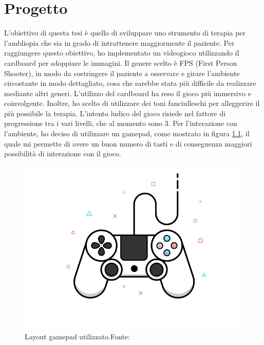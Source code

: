 \documentclass[
a4paper,
cleardoublepage=empty,
headings=twolinechapter,
numbers=autoenddot,
]{scrbook}
\begin{document}
	\chapter{Progetto}
	L'obiettivo di questa tesi è quello di sviluppare uno strumento di terapia per l'ambliopia che sia in grado di intrattenere maggiormente il paziente. Per raggiungere questo obiettivo, ho implementato un videogioco utilizzando il cardboard per sdoppiare le immagini. Il genere scelto è FPS (First Person Shooter), in modo da costringere il paziente a osservare e girare l'ambiente circostante in modo dettagliato, cosa che sarebbe stata più difficile da realizzare mediante altri generi. L'utilizzo del cardboard ha reso il gioco più immersivo e coinvolgente. Inoltre, ho scelto di utilizzare dei toni fanciulleschi per alleggerire il più possibile la terapia. L'intento ludico del gioco risiede nel fattore di progressione tra i vari livelli, che al momento sono 3. Per l'interazione con l'ambiente, ho deciso di utilizzare un gamepad, come mostrato in figura \ref{fig:gamepad}, il quale mi permette di avere un buon numero di tasti e di conseguenza maggiori possibilità di interazione con il gioco.
	\begin{figure}[H]
		\centering
		\includegraphics[width=0.8\linewidth]{image/gamepad}
		\caption{Layout gamepad utilizzato.Fonte:\cite{controller_image}}
		\label{fig:gamepad}
	\end{figure}
\end{document}
